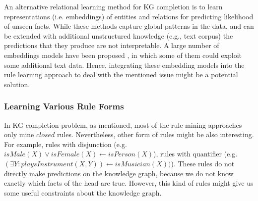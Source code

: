 An alternative relational learning method for KG completion is to learn representations (i.e. embeddings) of entities and relations for predicting likelihood of unseen facts. While these methods capture global patterns in the data, and can be extended with additional unstructured knowledge (e.g., text corpus) the predictions that they produce are not interpretable. A large number of embeddings models have been proposed \cite{8047276}, in which some of them could exploit some additional text data. Hence, integrating these embedding models into the rule learning approach to deal with the mentioned issue might be a potential solution.
\subsubsection{Learning Various Rule Forms}
In KG completion problem, as mentioned, most of the rule mining approaches only mine $closed$ rules. Nevertheless, other form of rules might be also interesting. For example, rules with disjunction (e.g. $isMale(X) \vee isFemale(X) \leftarrow isPerson(X)$), rules with quantifier (e.g. $(\exists Y: playsInstrument(X, Y)) \leftarrow isMusician(X))$). These rules do not directly make predictions on the knowledge graph, because we do not know exactly which facts of the head are true. However, this kind of rules might give us some useful constraints about the knowledge graph.
